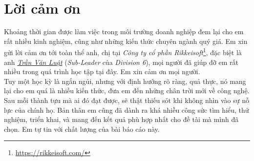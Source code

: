 \section*{
    \centering
    Lời cảm ơn
    \vspace{1.25cm}
}

Khoảng thời gian được làm việc trong môi trường doanh nghiệp đem lại cho em rất nhiều kinh nghiệm, cũng như những kiến thức chuyên ngành quý giá. Em xin gửi lời cảm ơn tới toàn thể anh, chị tại \textit{Công ty cổ phần Rikkeisoft}\footnote{\href{https://rikkeisoft.com/}{https://rikkeisoft.com/}}, đặc biệt là anh \href{mailto:luattv@rikkeisoft.com}{\textit{Trần Văn Luật}} (\textit{Sub-Leader} của \textit{Division 6}), mọi người đã giúp đỡ em rất nhiều trong quá trình học tập tại đây. Em xin cảm ơn mọi người.\\

Tuy một học kỳ là ngắn ngủi, nhưng với định hướng rõ ràng, quả thực, nó mang lại cho em quá là nhiều kiến thức, đưa em đến những chân trời mới về công nghệ. Sau mỗi thành tựu mà ai đó đạt được, sẽ thật thiếu sót khi không nhìn vào sự nỗ lực của chính họ. Bản thân em cũng đã dành ra khá nhiều công sức tìm hiểu, thử nghiệm, triển khai, và mang đến kết quả phù hợp nhất cho đề tài mà mình đã chọn. Em tự tin với chất lượng của bài báo cáo này.\\